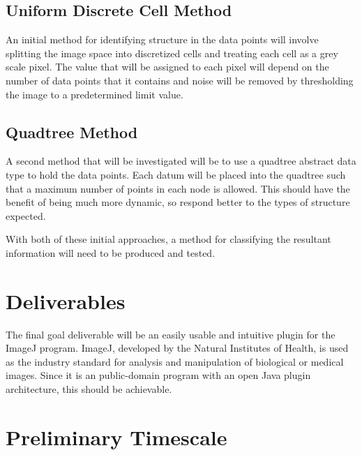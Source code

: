 \subsection{Uniform Discrete Cell Method}
\label{sub:uniform_discrete_cell_method}

An initial method for identifying structure in the data points will involve
splitting the image space into discretized cells and treating each cell as a
grey scale pixel. The value that will be assigned to each pixel will depend on
the number of data points that it contains and noise will be removed by
thresholding the image to a predetermined limit value.

\subsection{Quadtree Method}
\label{sub:quadtree_method}

A second method that will be investigated will be to use a quadtree abstract
data type to hold the data points. Each datum will be placed into the quadtree
such that a maximum number of points in each node is allowed. This should have
the benefit of being much more dynamic, so respond better to the types of
structure expected.

With both of these initial approaches, a method for classifying the resultant
information will need to be produced and tested.

\section{Deliverables}
\label{sec:deliverables}

The final goal deliverable will be an easily usable and intuitive plugin for
the ImageJ program. ImageJ\cite{rasband1997imagej}, developed by the Natural
Institutes of Health, is used as the industry standard for analysis and
manipulation of biological or medical images. Since it is an public-domain
program with an open Java plugin architecture, this should be achievable.

\section{Preliminary Timescale}
\label{sec:preliminary_timescale}


